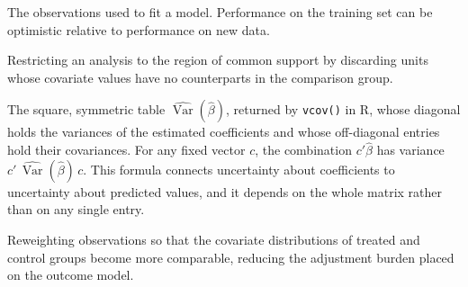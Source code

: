 \documentclass[11pt]{report}
\newcommand{\Var}{\operatorname{Var}}
\begin{document}
\begin{description}[style=nextline,leftmargin=0pt,labelindent=0pt,font=\bfseries]
\item[Training set] The observations used to fit a model. Performance on the training set can be optimistic relative to performance on new data.

\item[Trimming] Restricting an analysis to the region of common support by discarding units whose covariate values have no counterparts in the comparison group.

\item[Variance-covariance matrix] The square, symmetric table \(\widehat{\Var}(\widehat{\beta})\), returned by \texttt{vcov()} in R, whose diagonal holds the variances of the estimated coefficients and whose off-diagonal entries hold their covariances. For any fixed vector \(c\), the combination \(c'\widehat{\beta}\) has variance \(c'\,\widehat{\Var}(\widehat{\beta})\,c\). This formula connects uncertainty about coefficients to uncertainty about predicted values, and it depends on the whole matrix rather than on any single entry.

\item[Weighting] Reweighting observations so that the covariate distributions of treated and control groups become more comparable, reducing the adjustment burden placed on the outcome model.
\end{description}

\cleardoublepage
{}
{}
{\small\printindex}
\end{document}
